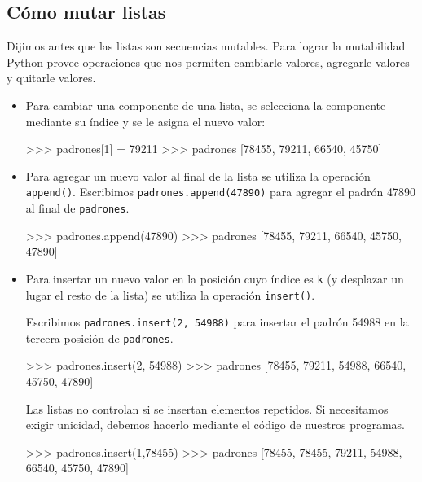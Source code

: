 \subsection{Cómo mutar listas}

Dijimos antes que las listas son secuencias mutables. Para lograr la
mutabilidad Python provee operaciones que nos permiten cambiarle valores,
agregarle valores y quitarle valores.

\begin{itemize}

\item Para cambiar una componente de una lista, se selecciona la componente
mediante su índice y se le asigna el nuevo valor:

\begin{codigo-python-sn}
>>> padrones[1] = 79211
>>> padrones
[78455, 79211, 66540, 45750]
\end{codigo-python-sn}

\item Para agregar un nuevo valor al final de la lista se utiliza la
operación \lstinline+append()+.  Escribimos \lstinline+padrones.append(47890)+ para
agregar el padrón 47890 al final de \lstinline+padrones+.

\begin{codigo-python-sn}
>>> padrones.append(47890)
>>> padrones
[78455, 79211, 66540, 45750, 47890]
\end{codigo-python-sn}

\item Para insertar un nuevo valor en la posición cuyo índice es
\lstinline+k+ (y desplazar un lugar el resto de la lista) se utiliza la
operación \lstinline+insert()+.

Escribimos \lstinline+padrones.insert(2, 54988)+ para insertar el padrón 54988 en
la tercera posición de \lstinline+padrones+.

\begin{codigo-python-sn}
>>> padrones.insert(2, 54988)
>>> padrones
[78455, 79211, 54988, 66540, 45750, 47890]
\end{codigo-python-sn}

\begin{observacion}
Las listas no controlan si se insertan elementos repetidos. Si necesitamos
exigir unicidad, debemos hacerlo mediante el código de nuestros programas.
\end{observacion}

\begin{codigo-python-sn}
>>> padrones.insert(1,78455)
>>> padrones
[78455, 78455, 79211, 54988, 66540, 45750, 47890]
\end{codigo-python-sn}


\end{itemize}
